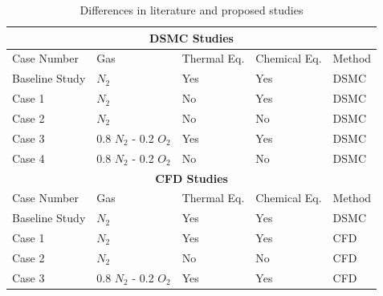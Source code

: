 \documentclass[11pt]{article}
\begin{document}
\begin{table}[t]
\centering
\small
\setlength{\tabcolsep}{6pt}
\renewcommand{\arraystretch}{1.15}
\begin{tabular}{l l l l l}
\hline
\multicolumn{5}{c}{\textbf{DSMC Studies}}\\
\hline
Case Number & Gas & Thermal Eq. & Chemical Eq. & Method\\
\hline
Baseline Study & $N_2$ & Yes & Yes & DSMC \\
Case 1 & $N_2$ & No & Yes & DSMC\\
Case 2 & $N_2$ & No & No & DSMC\\
Case 3 & 0.8 $N_2$ - 0.2 $O_2$ & Yes & Yes & DSMC\\
Case 4 & 0.8 $N_2$ - 0.2 $O_2$ & No & No & DSMC\\
\hline
\multicolumn{5}{c}{\textbf{CFD Studies}}\\
\hline
Case Number & Gas & Thermal Eq. & Chemical Eq. & Method\\
\hline
Baseline Study & $N_2$ & Yes & Yes & DSMC \\
Case 1 & $N_2$ & Yes & Yes & CFD\\
Case 2 & $N_2$ & No & No & CFD\\
Case 3 & 0.8 $N_2$ - 0.2 $O_2$ & Yes & Yes & CFD\\
\hline
\end{tabular}
\caption{Differences in literature and proposed studies}
\label{tab:differences}
\end{table}
\end{document}
